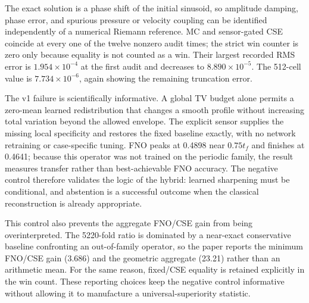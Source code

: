 \documentclass[10pt,twocolumn]{article}
\begin{document}
The exact solution is a phase shift of the initial sinusoid, so amplitude damping, phase error, and spurious pressure or velocity coupling can be identified independently of a numerical Riemann reference. MC and sensor-gated CSE coincide at every one of the twelve nonzero audit times; the strict win counter is zero only because equality is not counted as a win. Their largest recorded RMS error is $1.954\times10^{-4}$ at the first audit and decreases to $8.890\times10^{-5}$. The 512-cell value is $7.734\times10^{-6}$, again showing the remaining truncation error.

The v1 failure is scientifically informative. A global TV budget alone permits a zero-mean learned redistribution that changes a smooth profile without increasing total variation beyond the allowed envelope. The explicit sensor supplies the missing local specificity and restores the fixed baseline exactly, with no network retraining or case-specific tuning. FNO peaks at 0.4898 near $0.75t_f$ and finishes at 0.4641; because this operator was not trained on the periodic family, the result measures transfer rather than best-achievable FNO accuracy. The negative control therefore validates the logic of the hybrid: learned sharpening must be conditional, and abstention is a successful outcome when the classical reconstruction is already appropriate.

This control also prevents the aggregate FNO/CSE gain from being overinterpreted. The 5220-fold ratio is dominated by a near-exact conservative baseline confronting an out-of-family operator, so the paper reports the minimum FNO/CSE gain (3.686) and the geometric aggregate (23.21) rather than an arithmetic mean. For the same reason, fixed/CSE equality is retained explicitly in the win count. These reporting choices keep the negative control informative without allowing it to manufacture a universal-superiority statistic.
\end{document}
